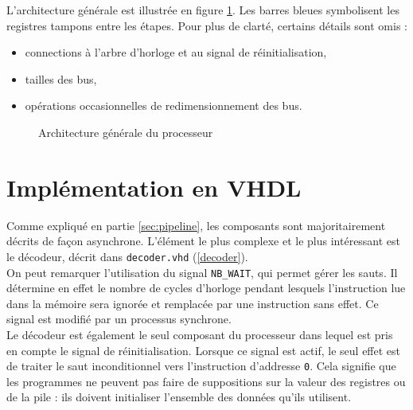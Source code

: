 L'architecture générale est illustrée en figure \ref{fig:architecture}. Les
barres bleues symbolisent les registres tampons entre les étapes. Pour plus de
clarté, certains détails sont omis :
\begin{itemize}
\item connections à l'arbre d'horloge et au signal de réinitialisation,
\item tailles des bus,
\item opérations occasionnelles de redimensionnement des bus.
\end{itemize}

\begin{landscape}
\begin{figure}[!h]
    \centering
    
    \caption{Architecture générale du processeur}
    \label{fig:architecture}
\end{figure}
\end{landscape}

\section{Implémentation en VHDL}

Comme expliqué en partie \ref{sec:pipeline}, les composants sont majoritairement
décrits de façon asynchrone. L'élément le plus complexe et le plus intéressant
est le décodeur, décrit dans \texttt{decoder.vhd} (\ref{decoder}). \\



On peut remarquer l'utilisation du signal \texttt{NB\_WAIT}, qui permet gérer
les sauts. Il détermine en effet le nombre de cycles d'horloge pendant lesquels
l'instruction lue dans la mémoire sera ignorée et remplacée par une instruction
sans effet. Ce signal est modifié par un processus synchrone. \\

Le décodeur est également le seul composant du processeur dans lequel est pris
en compte le signal de réinitialisation. Lorsque ce signal est actif, le seul
effet est de traiter le saut inconditionnel vers l'instruction d'addresse
\texttt{0}. Cela signifie que les programmes ne peuvent pas faire de
suppositions sur la valeur des registres ou de la pile : ils doivent initialiser
l'ensemble des données qu'ils utilisent.
